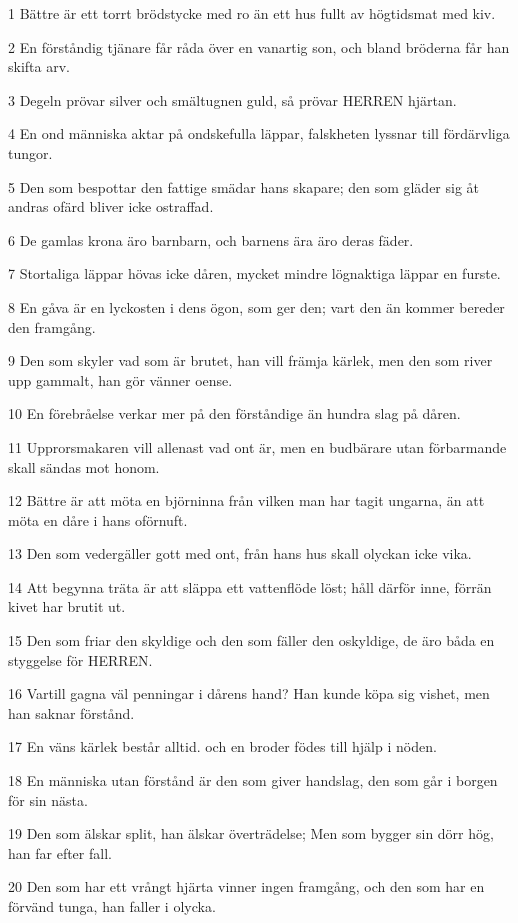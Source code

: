 \par 1 Bättre är ett torrt brödstycke med ro än ett hus fullt av högtidsmat med kiv.
\par 2 En förståndig tjänare får råda över en vanartig son, och bland bröderna får han skifta arv.
\par 3 Degeln prövar silver och smältugnen guld, så prövar HERREN hjärtan.
\par 4 En ond människa aktar på ondskefulla läppar, falskheten lyssnar till fördärvliga tungor.
\par 5 Den som bespottar den fattige smädar hans skapare; den som gläder sig åt andras ofärd bliver icke ostraffad.
\par 6 De gamlas krona äro barnbarn, och barnens ära äro deras fäder.
\par 7 Stortaliga läppar hövas icke dåren, mycket mindre lögnaktiga läppar en furste.
\par 8 En gåva är en lyckosten i dens ögon, som ger den; vart den än kommer bereder den framgång.
\par 9 Den som skyler vad som är brutet, han vill främja kärlek, men den som river upp gammalt, han gör vänner oense.
\par 10 En förebråelse verkar mer på den förståndige än hundra slag på dåren.
\par 11 Upprorsmakaren vill allenast vad ont är, men en budbärare utan förbarmande skall sändas mot honom.
\par 12 Bättre är att möta en björninna från vilken man har tagit ungarna, än att möta en dåre i hans oförnuft.
\par 13 Den som vedergäller gott med ont, från hans hus skall olyckan icke vika.
\par 14 Att begynna träta är att släppa ett vattenflöde löst; håll därför inne, förrän kivet har brutit ut.
\par 15 Den som friar den skyldige och den som fäller den oskyldige, de äro båda en styggelse för HERREN.
\par 16 Vartill gagna väl penningar i dårens hand? Han kunde köpa sig vishet, men han saknar förstånd.
\par 17 En väns kärlek består alltid. och en broder födes till hjälp i nöden.
\par 18 En människa utan förstånd är den som giver handslag, den som går i borgen för sin nästa.
\par 19 Den som älskar split, han älskar överträdelse; Men som bygger sin dörr hög, han far efter fall.
\par 20 Den som har ett vrångt hjärta vinner ingen framgång, och den som har en förvänd tunga, han faller i olycka.
